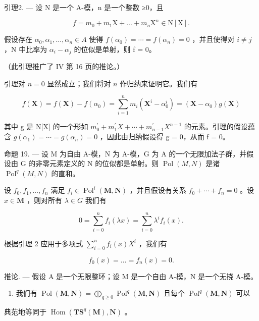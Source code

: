 引理2. --- 设 N 是一个 A-模，n 是一个整数 ≥0，且

\[
f = m _ {0} + m _ {1} \mathrm{X} + \dots + m _ {n} \mathrm{X} ^ {n} \in \mathrm{N} [ \mathrm{X} ].
\]

假设存在 \(\alpha_{0}, \alpha_{1}, \ldots, \alpha_{n} \in A\) 使得 \(f(\alpha_{0}) = \cdots = f(\alpha_{n}) = 0\) ，并且使得对 \(i \neq j\) ，N 中比率为 \(\alpha_{i} - \alpha_{j}\) 的位似是单射，则 f = 0。

（此引理推广了 IV 第 16 页的推论。）

引理对 \(n = 0\) 显然成立；我们将对 \(n\) 作归纳来证明它。我们有

\[
f (\mathbf {X}) = f (\mathbf {X}) - f \left(\alpha_ {0}\right) = \sum_ {i = 1} ^ {n} m _ {i} \left(\mathbf {X} ^ {i} - \alpha_ {0} ^ {i}\right) = \left(\mathbf {X} - \alpha_ {0}\right) g (\mathbf {X})
\]

其中 g 是 N{[}X{]} 的一个形如 \(m_{0}^{\prime} + m_{1}^{\prime} X + \cdots + m_{n-1}^{\prime} X^{n-1}\) 的元素。引理的假设蕴含 \(g(\alpha_{1}) = \cdots = g(\alpha_{n}) = 0\) ，因此由归纳假设得 g = 0，从而 f = 0。

命题 19. --- 设 M 为自由 A-模，N 为 A-模，G 为 A 的一个无限加法子群，并假设由 G 的非零元素定义的 N 的位似都是单射。则 \(\operatorname{Pol}(M,N)\) 是诸 \(\operatorname{Pol}^{q}(M,N)\) 的直和。

设 \(f_{0}, f_{1}, \ldots, f_{n}\) 满足 \(f_{i} \in \operatorname{Pol}^{i}(\mathbf{M}, \mathbf{N})\) ，并且假设有关系 \(f_{0} + \cdots + f_{n} = 0\) 。设 \(x \in \mathbf{M}\) ，则对所有 \(\lambda \in G\) 我们有

\[
0 = \sum_ {i = 0} ^ {n} f _ {i} (\lambda x) = \sum_ {i = 0} ^ {n} \lambda^ {i} f _ {i} (x).
\]

根据引理 2 应用于多项式 \(\sum_{i=0}^{n} f_i(x) X^i\) ，我们有

\[
f _ {0} (x) = \dots = f _ {n} (x) = 0.
\]

推论. --- 假设 A 是一个无限整环；设 M 是一个自由 A-模，N 是一个无挠 A-模。

\begin{enumerate}
\def\labelenumi{(\roman{enumi})}
\tightlist
\item
  我们有 \(\operatorname{Pol}(\mathbf{M},\mathbf{N}) = \bigoplus_{q\geqslant 0}\operatorname{Pol}^q (\mathbf{M},\mathbf{N})\) 且每个 \(\operatorname{Pol}^q (\mathbf{M},\mathbf{N})\) 可以
\end{enumerate}

典范地等同于 \(\operatorname{Hom}(\mathbf{TS}^q(\mathbf{M}),\mathbf{N})\) 。

